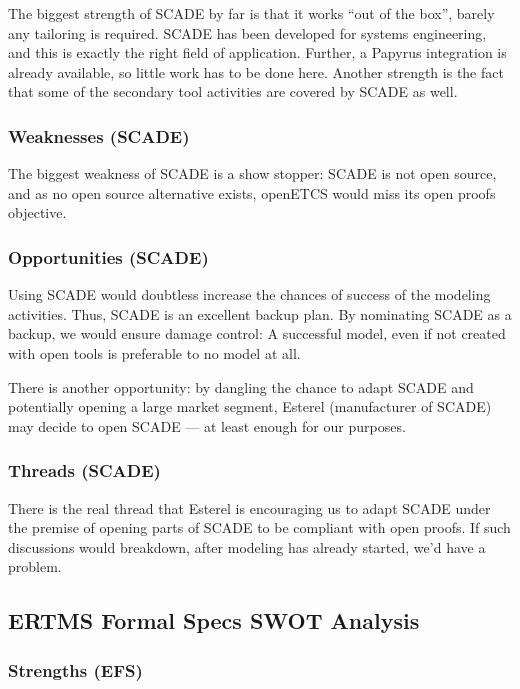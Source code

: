 The biggest strength of SCADE by far is that it works ``out of the box'', barely any tailoring is required.  SCADE has been developed for systems engineering, and this is exactly the right field of application.  Further, a Papyrus integration is already available, so little work has to be done here.  Another strength is the fact that some of the secondary tool activities are covered by SCADE as well.

\subsubsection{Weaknesses (SCADE)}

The biggest weakness of SCADE is a show stopper: SCADE is not open source, and as no open source alternative exists, openETCS would miss its open proofs objective.

\subsubsection{Opportunities (SCADE)}

Using SCADE would doubtless increase the chances of success of the modeling activities.  Thus, SCADE is an excellent backup plan.  By nominating SCADE as a backup, we would ensure damage control: A successful model, even if not created with open tools is preferable to no model at all.

There is another opportunity: by dangling the chance to adapt SCADE and potentially opening a large market segment, Esterel (manufacturer of SCADE) may decide to open SCADE --- at least enough for our purposes.

\subsubsection{Threads (SCADE)}

There is the real thread that Esterel is encouraging us to adapt SCADE under the premise of opening parts of SCADE to be compliant with open proofs.  If such discussions would breakdown, after modeling has already started, we'd have a problem.

\subsection{ERTMS Formal Specs SWOT Analysis}

\subsubsection{Strengths (EFS)}

